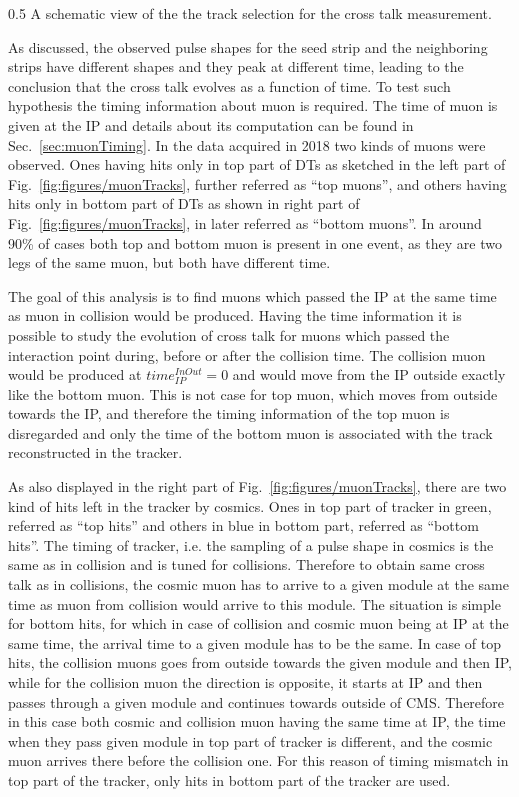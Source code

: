                  {0.5}       %
                 { A schematic view of the the track selection for the cross talk measurement. }

As discussed, the observed pulse shapes for the seed strip and the neighboring strips have different shapes and they peak at different time, leading to the conclusion that the cross talk evolves as a function of time. To test such hypothesis the timing information about muon is required. The time of muon is given at the IP and details about its computation can be found in Sec.~\ref{sec:muonTiming}. In the data acquired in 2018 two kinds of muons were observed. Ones having hits only in top part of DTs as sketched in the left part of Fig.~\ref{fig:figures/muonTracks}, further referred as ``top muons'',  and others having hits only in bottom part of DTs as shown in right part of Fig.~\ref{fig:figures/muonTracks}, in later referred as ``bottom muons''. In around 90\% of cases both top and bottom muon is present in one event, as they are two legs of the same muon, but both have different time. 

The goal of this analysis is to find muons which passed the IP at the same time as muon in collision would be produced. Having the time information it is possible to study the evolution of cross talk for muons which passed the interaction point during, before or after the collision time. The collision muon would be produced at $time_{IP}^{InOut}=0$ and would move from the IP outside exactly like the bottom muon. This is not case for top muon, which moves from outside towards the IP, and therefore the timing information of the top muon is disregarded and only the time of the bottom muon is associated with the track reconstructed in the tracker. 

As also displayed in the right part of Fig.~\ref{fig:figures/muonTracks}, there are two kind of hits left in the tracker by cosmics. Ones in top part of tracker in green, referred as ``top hits'' and others in blue in bottom part, referred as ``bottom hits''. The timing of tracker, i.e. the sampling of a pulse shape in cosmics is the same as in collision and is tuned for collisions. Therefore to obtain same cross talk as in collisions, the cosmic muon has to arrive to a given module at the same time as muon from collision would arrive to this module. The situation is simple for bottom hits, for which in case of collision and cosmic muon being at IP at the same time, the arrival time to a given module has to be the same. In case of top hits, the collision muons goes from outside towards the given module and then IP, while for the collision muon the direction is opposite, it starts at IP and then passes through a given module and continues towards outside of CMS. Therefore in this case both cosmic and collision muon having the same time at IP, the time when they pass given module in top part of tracker is different, and the cosmic muon arrives there before the collision one. For this reason of timing mismatch in top part of the tracker, only hits in bottom part of the tracker are used.

